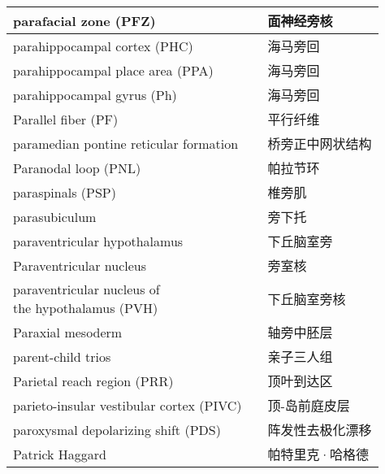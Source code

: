 \begin{longtable}{lll}
	\midrule
	parafacial zone (PFZ) && 面神经旁核   \\
	
	\midrule
	parahippocampal cortex (PHC)  && 海马旁回   \\
	
	\midrule
	parahippocampal place area (PPA)  && 海马旁回   \\
	
	\midrule
	parahippocampal gyrus  (Ph)   && 海马旁回   \\
	
	\midrule
	Parallel fiber (PF)    && 平行纤维   \\
	
	\midrule
	paramedian pontine reticular formation     && 桥旁正中网状结构   \\
	
	\midrule
	Paranodal loop (PNL)    && 帕拉节环   \\
	
	\midrule
	paraspinals (PSP)     && 椎旁肌   \\
	
	\midrule
	parasubiculum     && 旁下托   \\
	
	\midrule
	paraventricular hypothalamus     && 下丘脑室旁   \\
	
	\midrule
	Paraventricular nucleus     && 旁室核   \\
	
	\midrule
	\makecell[l]{paraventricular nucleus of\\ the hypothalamus (PVH)}    && 下丘脑室旁核   \\
	
	\midrule
	Paraxial mesoderm     && 轴旁中胚层   \\
	
	\midrule
	parent-child trios     && 亲子三人组   \\
	
	\midrule
	Parietal reach region (PRR)     && 顶叶到达区   \\
	
	\midrule
	parieto-insular vestibular cortex (PIVC)     && 顶-岛前庭皮层   \\
	
	\midrule
	paroxysmal depolarizing shift (PDS)     && 阵发性去极化漂移   \\
	
	\midrule
	Patrick Haggard     && 帕特里克·哈格德   \\
	

\end{longtable}
